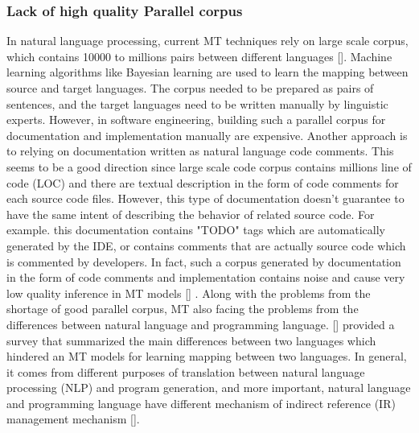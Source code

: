 \subsubsection{Lack of high quality Parallel corpus}
In natural language processing, current MT techniques rely on large scale corpus, which contains 10000 to millions pairs between different languages [\cite{luong17}]. Machine learning algorithms like Bayesian learning are used to learn the mapping between source and target  languages. The corpus needed to be prepared as pairs of sentences, and the target languages need to be written manually by linguistic experts. However, in software engineering, building such a parallel corpus for documentation and implementation manually are expensive. 
Another approach is to relying on documentation written as natural language code comments. This seems to be a good direction since large scale code corpus contains millions line of code (LOC) and there are textual description in the form of code comments for each source code files. However, this type of documentation doesn't guarantee to have the same intent of describing the behavior of related source code. For example. this documentation contains "TODO" tags which are automatically generated by the IDE, or  contains comments that are actually source code which is commented by developers. In fact, such a corpus generated by documentation in the form of code comments and implementation contains noise and cause very low quality inference in MT models [\cite{DBLP:journals/corr/BaroneS17}] .
Along with the problems from the shortage of good parallel corpus, MT also facing the problems from the differences between natural language and programming language. [\cite{Pulido-Prieto:2017:SNP:3145473.3109481}] provided a survey that summarized the main differences between two languages which hindered an MT models for learning mapping between two languages. In general, it comes from different purposes of translation between natural language processing (NLP) and program generation, and more important, natural language and programming language have different mechanism of indirect reference (IR) management mechanism [\cite{Pulido-Prieto:2017:SNP:3145473.3109481}].
